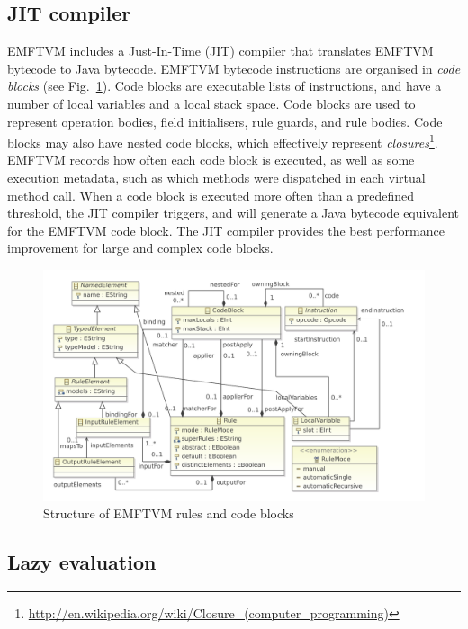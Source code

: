 \documentclass[submission,copyright,creativecommons]{eptcs}
\begin{document}
\subsection{JIT compiler}

EMFTVM includes a Just-In-Time (JIT) compiler that translates EMFTVM bytecode to Java bytecode. EMFTVM bytecode instructions are organised in \emph{code blocks} (see Fig.~\ref{fig:emftvm-rules}). Code blocks are executable lists of instructions, and have a number of local variables and a local stack space. Code blocks are used to represent operation bodies, field initialisers, rule guards, and rule bodies. Code blocks may also have nested code blocks, which effectively represent \emph{closures}\footnote{\url{http://en.wikipedia.org/wiki/Closure\_(computer_programming)}}. EMFTVM records how often each code block is executed, as well as some execution metadata, such as which methods were dispatched in each virtual method call. When a code block is executed more often than a predefined threshold, the JIT compiler triggers, and will generate a Java bytecode equivalent for the EMFTVM code block. The JIT compiler provides the best performance improvement for large and complex code blocks.

\begin{figure}[ht]
\centerline{
\includegraphics[width=12cm]{figures/emftvm-rules-stripped}}
\caption{Structure of EMFTVM rules and code blocks}
\label{fig:emftvm-rules}
\end{figure}

\subsection{Lazy evaluation}
\end{document}
